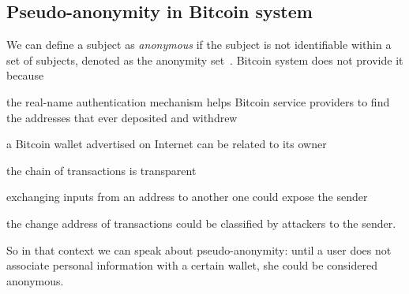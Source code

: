 \subsection{Pseudo-anonymity in Bitcoin system}
We can define a subject as \textit{anonymous} if the subject is not identifiable
within a set of subjects, denoted as the anonymity
set~\cite{bib:terminology}. Bitcoin system does not provide it
because~\cite{bib:deanon}
\begin{enumerate*}[label=\roman*),itemjoin={,\quad}]
\item the real-name authentication mechanism helps Bitcoin service
providers to find the addresses that ever deposited and withdrew
\item a Bitcoin wallet advertised on Internet can be related to its
owner
\item the chain of transactions is transparent
\item exchanging inputs from an address to another one could expose the
sender
\item the change address of transactions could be classified by
attackers to the sender.
\end{enumerate*}
So in that context we can speak about pseudo-anonymity: until a user
does not associate personal information with a certain wallet, she
could be considered anonymous.
